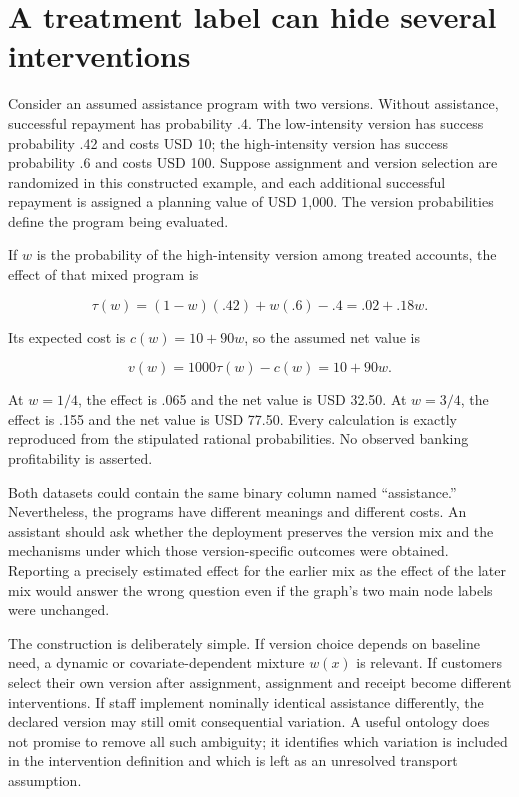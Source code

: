 \hypertarget{a-treatment-label-can-hide-several-interventions}{%
\section{A treatment label can hide several
interventions}\label{a-treatment-label-can-hide-several-interventions}}

Consider an assumed assistance program with two versions. Without
assistance, successful repayment has probability .4. The low-intensity
version has success probability .42 and costs USD 10; the high-intensity
version has success probability .6 and costs USD 100. Suppose assignment
and version selection are randomized in this constructed example, and
each additional successful repayment is assigned a planning value of USD
1,000. The version probabilities define the program being evaluated.

If \(w\) is the probability of the high-intensity version among treated
accounts, the effect of that mixed program is

\[
 \tau(w)=(1-w)(.42)+w(.6)-.4=.02+.18w.
\]

Its expected cost is \(c(w)=10+90w\), so the assumed net value is

\[
 v(w)=1000\tau(w)-c(w)=10+90w.
\]

At \(w=1/4\), the effect is .065 and the net value is USD 32.50. At
\(w=3/4\), the effect is .155 and the net value is USD 77.50. Every
calculation is exactly reproduced from the stipulated rational
probabilities. No observed banking profitability is asserted.
\citep{exec13_ontology_examples}

Both datasets could contain the same binary column named ``assistance.''
Nevertheless, the programs have different meanings and different costs.
An assistant should ask whether the deployment preserves the version mix
and the mechanisms under which those version-specific outcomes were
obtained. Reporting a precisely estimated effect for the earlier mix as
the effect of the later mix would answer the wrong question even if the
graph's two main node labels were unchanged.

The construction is deliberately simple. If version choice depends on
baseline need, a dynamic or covariate-dependent mixture \(w(x)\) is
relevant. If customers select their own version after assignment,
assignment and receipt become different interventions. If staff
implement nominally identical assistance differently, the declared
version may still omit consequential variation. A useful ontology does
not promise to remove all such ambiguity; it identifies which variation
is included in the intervention definition and which is left as an
unresolved transport assumption.

